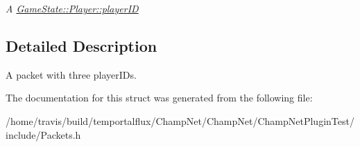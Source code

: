 \begin{DoxyCompactItemize}
\begin{DoxyCompactList}\small\item\em A \hyperlink{class_game_state_1_1_player_acbd28d89e6eb8611aa66452ec31e9133}{Game\-State\-::\-Player\-::player\-I\-D} \end{DoxyCompactList}\end{DoxyCompactItemize}


\subsection{Detailed Description}
A packet with three player\-I\-Ds. 

The documentation for this struct was generated from the following file\-:\begin{DoxyCompactItemize}
\item 
/home/travis/build/temportalflux/\-Champ\-Net/\-Champ\-Net/\-Champ\-Net\-Plugin\-Test/include/Packets.\-h\end{DoxyCompactItemize}
